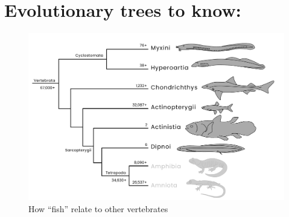 \documentclass[a4paper,12pt]{article}
\begin{document}
%
%

\pagestyle{fancyplain}
\fancyhf{}
\thispagestyle{plain}

\section*{Evolutionary trees to know:}
\begin{figure}[H]
\centering
  \includegraphics[scale=0.4]{Vertebrata_fishes_tre.pdf}
  \caption{How ``fish'' relate to other vertebrates}
  \label{fig:Fishes}
\end{figure}

\end{document}
